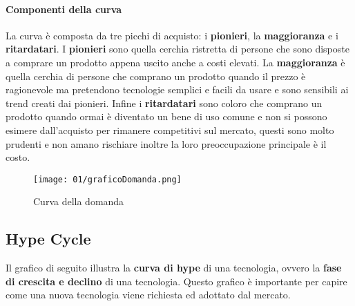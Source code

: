         \paragraph{Componenti della curva} 
            La curva è composta da tre picchi di acquisto: i \textbf{pionieri}, la \textbf{maggioranza} e i \textbf{ritardatari}.\newline 
            I \textbf{pionieri} sono quella cerchia ristretta di persone che sono disposte a comprare un prodotto appena uscito anche a costi elevati. La \textbf{maggioranza} è quella cerchia di persone che comprano un prodotto quando il prezzo è ragionevole ma pretendono tecnologie semplici e facili da usare e sono sensibili ai trend creati dai pionieri. Infine i \textbf{ritardatari} sono coloro che comprano un prodotto quando ormai è diventato un bene di uso comune e non si possono esimere dall'acquisto per rimanere competitivi sul mercato, questi sono molto prudenti e non amano rischiare inoltre la loro preoccupazione principale è il costo.
            \begin{figure}[H]
                \centering
                \texttt{[image: 01/graficoDomanda.png]}
                \caption{Curva della domanda}
            \end{figure}
    
    \subsection{Hype Cycle}
        Il grafico di seguito illustra la \textbf{curva di hype} di una tecnologia, ovvero la \textbf{fase di crescita e declino} di una tecnologia. Questo grafico è importante per capire come una nuova tecnologia viene richiesta ed adottato dal mercato.
